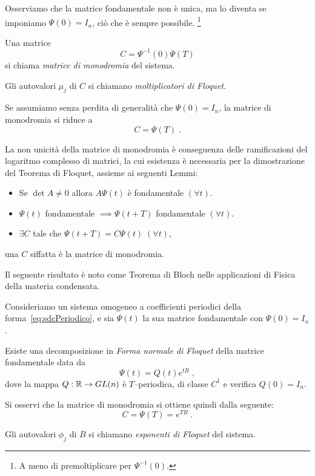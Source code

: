 Osserviamo che la matrice fondamentale non è unica, ma lo diventa se imponiamo $\Psi(0)=I_n$, ciò
che è sempre possibile.
\footnote{A meno di premoltiplicare per $\Psi^{-1} (0)$.}

\begin{definizione}
    Una matrice
    $$C= \Psi^{-1} (0) \Psi (T) $$
    si chiama \emph{matrice di monodromia} del sistema.

    Gli autovalori $\mu_j$ di $C$ si chiamano \emph{moltiplicatori di Floquet}.
\end{definizione}

Se assumiamo senza perdita di generalità che $\Psi (0) = I_n$, la matrice di monodromia si riduce a
$$C= \Psi (T) \; .$$

La non unicità della matrice di monodromia è conseguenza delle ramificazioni del logaritmo complesso
di matrici, la cui esistenza è necessaria per la dimostrazione del Teorema di Floquet, assieme ai
seguenti Lemmi:
\begin{itemize}
    \item Se $\det A \neq 0$ allora $A \Psi (t)$ è fondamentale $(\forall t)$.
    \item $\Psi (t)$ fondamentale $\implies \Psi (t+T)$ fondamentale $(\forall t)$.
    \item $\exists C$ tale che $\Psi (t+T) = C \Psi (t) \; (\forall t)$,
\end{itemize}
una $C$ siffatta è la matrice di monodromia.

Il seguente risultato è noto come Teorema di Bloch nelle applicazioni di Fisica della materia condensata.

\begin{teorema}[Di Floquet]
    Consideriamo un sistema omogeneo a coefficienti periodici della forma~\eqref{eq:sdcPeriodico}, e
    sia $\Psi (t)$ la sua matrice fondamentale con $\Psi (0) = I_n$.

    Esiste una decomposizione in \emph{Forma normale di Floquet} della matrice fondamentale data da
    $$\Psi (t) = Q(t) e^{tB} \; ,$$
    dove la mappa $Q : \mathbb{R} \rightarrow GL(n)$ è $T$--periodica, di classe $C^1$ e verifica $Q(0) = I_n$.
    \label{teo:floquet}
\end{teorema}
Si osservi che la matrice di monodromia si ottiene quindi dalla seguente:
$$C= \Psi (T) = e^{TB} \; .$$

\begin{definizione}
    Gli autovalori $\phi_j$ di $B$ si chiamano \emph{esponenti di Floquet} del sistema.
\end{definizione}

